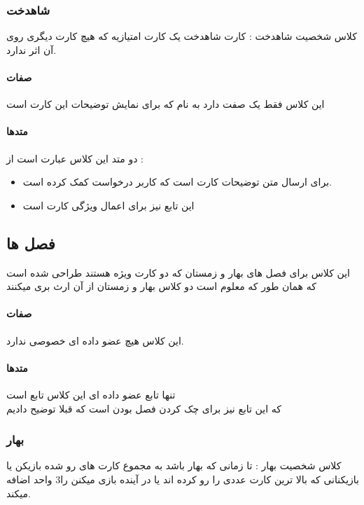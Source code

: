 \documentclass[pdf,titlepage,a4paper]{report}
\begin{document}
	\subsubsection{شاهدخت}
	 کلاس شخصیت شاهدخت : کارت شاهدخت یک کارت امتیازیه که هیچ کارت دیگری روی آن اثر ندارد.
	\paragraph{صفات}
	این کلاس فقط یک صفت دارد به نام   که برای نمایش توضیحات این کارت است
	\paragraph{متدها}

	 دو متد این کلاس عبارت است از : \\
	
	\begin{itemize}
		\item {}  برای ارسال متن توضیحات کارت است که کاربر درخواست کمک کرده است.
		\item {} این تابع نیز برای اعمال ویژگی کارت است
	\end{itemize}
	

	\subsection{فصل ها}
    این کلاس برای فصل های بهار و زمستان که دو کارت ویژه هستند طراحی شده است که همان طور که معلوم است دو کلاس بهار و زمستان از آن ارث بری میکنند

	\paragraph{صفات}
	این کلاس هیچ عضو داده ای خصوصی ندارد.
	\paragraph{متدها}
	تنها تابع عضو داده ای این کلاس تابع  است \\ 
	که این تابع نیز برای چک کردن فصل بودن است که قبلا توضیح دادیم
	
	\subsubsection{بهار}
	 کلاس شخصیت بهار : تا زمانی که بهار باشد به مجموع کارت های رو شده بازیکن یا بازیکنانی که بالا ترین کارت عددی را رو کرده اند یا  در آینده بازی میکنن را3 واحد اضافه میکند.
\end{document}
